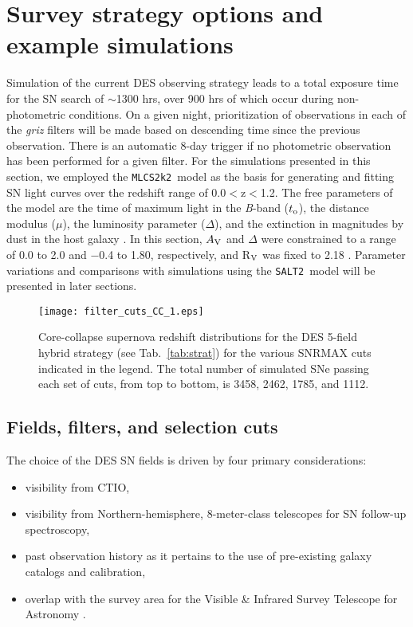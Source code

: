 \documentclass[preprint2]{aastex}    %
\newcommand{\mlcs}{{\tt MLCS2k2}}
\newcommand{\salt}{{\tt SALT2}}
\begin{document}
\section{Survey strategy options and example simulations}\label{sec:simopt}
Simulation of the current DES observing strategy leads to a total exposure time for the SN search of 
$\sim$1300 hrs, over 900 hrs of which occur during non-photometric conditions. 
On a given night, prioritization of observations in each of the \textit{griz} filters 
will be made based on descending time since the previous observation. There is an automatic 
8-day trigger if no photometric observation has been performed for a given 
filter. 
For the simulations presented in this section, we employed the \mlcs\ model as the basis for generating and fitting SN light curves over the redshift range of 
0.0$<$z$<$1.2. The free parameters of the model are the 
time of maximum light in the \textit{B}-band ($t_{\rm o}$), the distance modulus ($\mu$), 
the luminosity parameter ($\Delta$), and the extinction in 
magnitudes by dust in the host galaxy \citep[parametrized by A$_{\rm V}$ 
and R$_{\rm V}$ from][]{car89}. In this section, $A_{\rm V}$ and $\Delta$ were constrained 
to a range of 0.0 to 2.0 and $-$0.4 to 1.80, respectively, and R$_{\rm V}$ was fixed 
to 2.18 \citep{kes09}.  Parameter variations and comparisons with simulations using
the \salt\ model will be presented in later sections.

\begin{figure}[t]
\centerline{\texttt{[image: filter\_cuts\_CC\_1.eps]}}
\caption{
Core-collapse supernova redshift distributions for the DES 5-field hybrid strategy 
(see Tab.~\ref{tab:strat}) 
for the various SNRMAX cuts indicated in the legend. The total number of 
simulated SNe passing each set of cuts, from top to bottom, is 3458, 2462, 1785, and 1112.}
\label{fig:cutsCC}
\end{figure}

\subsection{Fields, filters, and selection cuts}\label{sec:fields}
The choice of the DES SN fields is driven by four primary considerations:
\begin{itemize}
 \item visibility from CTIO,
 \item visibility from Northern-hemisphere, 8-meter-class telescopes for SN follow-up spectroscopy,
 \item past observation history as it pertains to the use of pre-existing galaxy catalogs and calibration,
 \item overlap with the survey area for the Visible \& Infrared Survey Telescope 
for Astronomy \citep[VISTA,][see $\S$\ref{sec:video}]{eme04}.
\end{itemize}
\end{document}
